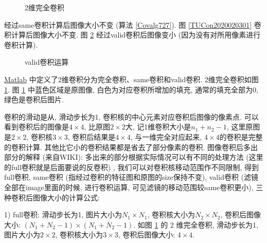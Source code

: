 \begin{figure}[H]
    \centering
    \caption{2维完全卷积}
    \label{CNN20161021141659634}
\end{figure}

经过same卷积计算后图像大小不变 (算法 \ref{Covalg727}).
图 \ref{TUCon2020020301} 卷积计算后图像大小不变.
图 \ref{20161021135241205} 经过valid卷积后图像变小 (因为没有对所用像素进行卷积计算).
\vspace{-0.3cm}
\begin{figure}[H]
    \centering
    \caption{valid卷积运算}
    \label{20161021135241205}
    \vspace{-0.3cm}
\end{figure}

\href{https://cn.mathworks.com/help/matlab/ref/conv2.html?requestedDomain=www.mathworks.com}{Matlab} 中定义了2维卷积分为完全卷积、same卷积和valid卷积.
2维完全卷积如图 \ref{CNN20161021141659634}.
图 \ref{CNN20161021141659634} 中蓝色区域是原图像, 白色为对应卷积所增加的填充, 通常的填充全部为0, 绿色是卷积后图片.

卷积的滑动是从, 滑动步长为1, 卷积核的中心元素对应卷积后图像的像素点.
可以看到卷积后的图像是$4\times 4$, 比原图$2\times 2$大, 记1维卷积大小是$n_1+n_2-1$, 这里原图是$2\times 2$, 卷积核$3\times 3$, 卷积后结果是$4\times 4$, 与一维完全对应起来,
$4\times 4$的卷积是完整的卷积计算. 其他比它小的卷积结果都是省去了部分像素的卷积.
图像卷积后多出部分的解释 (来自WIKI): 多出来的部分根据实际情况可以有不同的处理方法 (这里的full卷积就是后面要说的反卷积) ,
我们可以对卷积核移动范围作不同限制, 得到full卷积, same卷积 (指经过卷积的特征图和原图的size保持不变),
valid卷积 (滤镜全部在image里面的时候, 进行卷积运算, 可见滤镜的移动范围较same卷积更小), 三种卷积后图像大小的计算公式:

1) full卷积: 滑动步长为1, 图片大小为$N_1\times N_1$, 卷积核大小为$N_2\times N_2$, 卷积后图像大小: $ (N_1+N_2-1) \times (N_1+N_2-1)$.
如图 \ref{CNN20161021141659634} 的 2 维完全卷积, 滑动步长为1, 图片大小为$2\times 2$, 卷积核大小为$3\times 3$, 卷积后图像大小: $4\times 4$.

